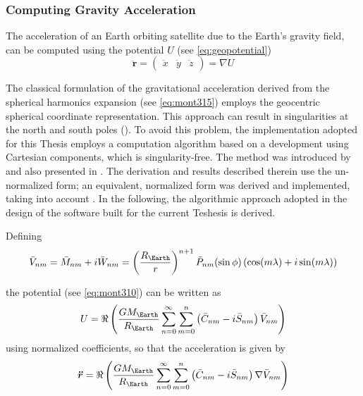 \subsubsection{Computing Gravity Acceleration}\label{sssec:gravity-acceleration}

The acceleration of an Earth orbiting satellite due to the Earth's gravity field, 
can be computed using the potential $U$ (see \autoref{eq:geopotential})
\begin{equation}
  \bm{\ddot{r}} =  
    \begin{pmatrix} \ddot{x} & \ddot{y} & \ddot{z} \end{pmatrix} = 
    \nabla U
\end{equation}

The classical formulation of the gravitational acceleration derived from the spherical 
harmonics expansion (see \autoref{eq:mont315}) employs the geocentric spherical coordinate 
representation. This approach can result in singularities at the north and 
south poles (\cite{Atallah2022}). To avoid this problem, the implementation adopted 
for this Thesis employs a computation algorithm based on a development using 
Cartesian components, which is singularity-free. The method was introduced by 
\cite{Cunningham1970} and also presented in \cite{Montenbruck2000}. The derivation 
and results described therein use the un-normalized form; an equivalent, normalized 
form was derived and implemented, taking into account \cite{Atallah2022}. In the 
following, the algorithmic approach adopted in the design of the software built 
for the current Teshesis is derived.

Defining
\begin{equation}
  \bar{V}_{nm} = \bar{M}_{nm} + i \bar{W}_{nm} = 
    \left( \frac{R_{\Earth}}{r} \right) ^{n+1} \bar{P}_{nm} (\sin \phi) 
      \left( \cos (m\lambda) + i \sin (m\lambda) \right)
\end{equation}

the potential (see \autoref{eq:mont310}) can be written as 
\begin{equation}
  U = \Re \left( \frac{GM_{\Earth}}{R_{\Earth}} \sum_{n=0}^{\infty} \sum_{m=0}^{n} 
    \left( \bar{C}_{nm} - i \bar{S}_{nm} \right) \bar{V}_{nm} \right)
\end{equation}
using normalized coefficients, so that the acceleration is given by
\begin{equation}
  \bm{\ddot{r}} = \Re \left( \frac{GM_{\Earth}}{R_{\Earth}} \sum_{n=0}^{\infty} \sum_{m=0}^{n} 
    \left( \bar{C}_{nm} - i \bar{S}_{nm} \right) \nabla \bar{V}_{nm} \right)
\end{equation}

